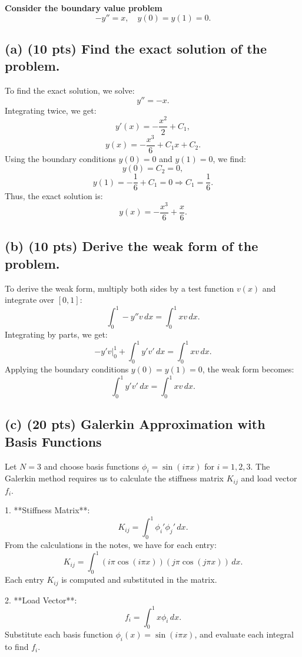 \documentclass[11pt]{article}
\begin{document}
\textbf{Consider the boundary value problem}
\[
-y'' = x, \quad y(0) = y(1) = 0.
\]

\subsection*{(a) (10 pts) Find the exact solution of the problem.}

To find the exact solution, we solve:
\[
y'' = -x.
\]
Integrating twice, we get:
\[
y'(x) = -\frac{x^2}{2} + C_1,
\]
\[
y(x) = -\frac{x^3}{6} + C_1 x + C_2.
\]
Using the boundary conditions \( y(0) = 0 \) and \( y(1) = 0 \), we find:
\[
y(0) = C_2 = 0,
\]
\[
y(1) = -\frac{1}{6} + C_1 = 0 \Rightarrow C_1 = \frac{1}{6}.
\]
Thus, the exact solution is:
\[
y(x) = -\frac{x^3}{6} + \frac{x}{6}.
\]

\subsection*{(b) (10 pts) Derive the weak form of the problem.}

To derive the weak form, multiply both sides by a test function \( v(x) \) and integrate over \( [0, 1] \):
\[
\int_0^1 -y'' v \, dx = \int_0^1 x v \, dx.
\]
Integrating by parts, we get:
\[
\left. -y' v \right|_0^1 + \int_0^1 y' v' \, dx = \int_0^1 x v \, dx.
\]
Applying the boundary conditions \( y(0) = y(1) = 0 \), the weak form becomes:
\[
\int_0^1 y' v' \, dx = \int_0^1 x v \, dx.
\]

\subsection*{(c) (20 pts) Galerkin Approximation with Basis Functions}

Let \( N = 3 \) and choose basis functions \( \phi_i = \sin(i \pi x) \) for \( i = 1, 2, 3 \). The Galerkin method requires us to calculate the stiffness matrix \( K_{ij} \) and load vector \( f_i \).

1. **Stiffness Matrix**: 
   \[
   K_{ij} = \int_0^1 \phi_i' \phi_j' \, dx.
   \]
   From the calculations in the notes, we have for each entry:
   \[
   K_{ij} = \int_0^1 \left( i \pi \cos(i \pi x) \right) \left( j \pi \cos(j \pi x) \right) \, dx.
   \]
   Each entry \( K_{ij} \) is computed and substituted in the matrix.

2. **Load Vector**:
   \[
   f_i = \int_0^1 x \phi_i \, dx.
   \]
   Substitute each basis function \( \phi_i(x) = \sin(i \pi x) \), and evaluate each integral to find \( f_i \).
\end{document}
